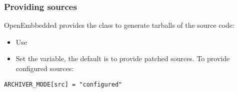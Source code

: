 \begin{frame}[fragile]
  \frametitle{Providing sources}
  OpenEmbbedded provides the  class to generate
  tarballs of the source code:
  \begin{itemize}
  \item Use 
  \item Set the  variable, the default is to
    provide patched sources. To provide configured sources:
  \end{itemize}
    \begin{block}{}
      \fontsize{9}{9}\selectfont
      \begin{verbatim}
ARCHIVER_MODE[src] = "configured"
      \end{verbatim}
    \end{block}
\end{frame}
